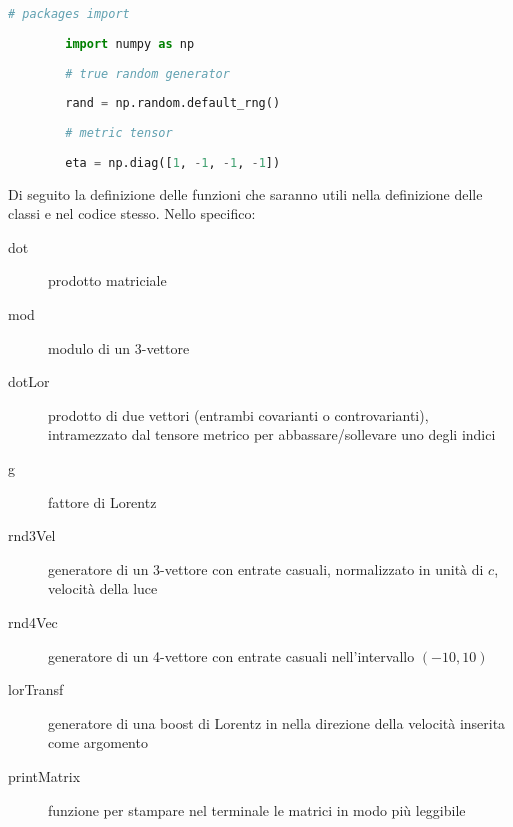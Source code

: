 \documentclass[12pt]{report}
\begin{document}
\begin{lstlisting}[language=Python]
		# packages import
		
		import numpy as np
		
		# true random generator
		
		rand = np.random.default_rng()
		
		# metric tensor
		
		eta = np.diag([1, -1, -1, -1])
\end{lstlisting}

Di seguito la definizione delle funzioni che saranno utili nella definizione delle classi e nel codice stesso. Nello specifico:

\begin{description}
	\item[dot] prodotto matriciale
	
	\item[mod] modulo di un 3-vettore
	
	\item[dotLor] prodotto di due vettori (entrambi covarianti o controvarianti), intramezzato dal tensore metrico per abbassare/sollevare uno degli indici
	
	\item[g] fattore di Lorentz
	
	\item[rnd3Vel] generatore di un 3-vettore con entrate casuali, normalizzato in unità di $c$, velocità della luce
	
	\item[rnd4Vec] generatore di un 4-vettore con entrate casuali nell'intervallo $(-10,10)$
	
	\item[lorTransf] generatore di una boost di Lorentz in nella direzione della velocità inserita come argomento
	
	\item[printMatrix] funzione per stampare nel terminale le matrici in modo più leggibile
\end{description}
\end{document}
